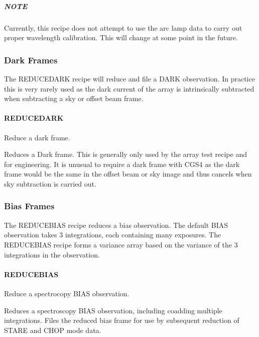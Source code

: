 \documentclass[twoside,11pt]{article}
\renewcommand{\_}{\texttt{\symbol{95}}}
\begin{document}
\subparagraph*{NOTE\label{REDUCE_ARC_NOTE}}


Currently, this recipe does not attempt to use the arc lamp data to
carry out proper wavelength calibration. This will change at some
point in the future.


\subsubsection{Dark Frames}

The REDUCE\_DARK recipe will reduce and file a DARK observation. In
practice this is very rarely used as the dark current of the array is
intrinsically subtracted when subtracting a sky or offset beam frame.

\paragraph{REDUCE\_DARK\label{REDUCE_DARK}}


Reduce a dark frame.


\mbox{}


Reduces a Dark frame. This is generally only used by the array test
recipe and for engineering. It is unusual to require a dark frame with CGS4 as
the dark frame would be the same in the offset beam or sky image and
thus cancels when sky subtraction is carried out.


\subsubsection{Bias Frames}

The REDUCE\_BIAS recipe reduces a bias observation. The default BIAS
observation takes 3 integrations, each containing many exposures. The
REDUCE\_BIAS recipe forms a variance array based on the variance of the
3 integrations in the observation.


\paragraph{REDUCE\_BIAS\label{REDUCE_BIAS}}


Reduce a spectrocopy BIAS observation.


\mbox{}


Reduces a spectroscopy BIAS observation, including coadding multiple
integrations. Files the reduced bias frame for use by subsequent
reduction of STARE and CHOP mode data.
\end{document}
